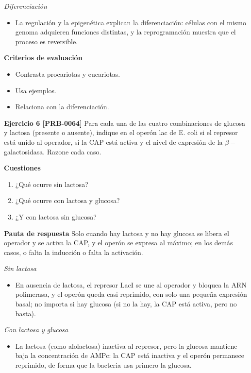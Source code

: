 \documentclass{book}
\begin{document}
\noindent\textit{Diferenciación}
\begin{itemize}
\item La regulación y la epigenética explican la diferenciación: células con el mismo genoma adquieren funciones distintas, y la reprogramación muestra que el proceso es reversible.
\end{itemize}

\noindent\textbf{Criterios de evaluación}
\begin{itemize}
\item Contrasta procariotas y eucariotas.
\item Usa ejemplos.
\item Relaciona con la diferenciación.
\end{itemize}

\noindent\textbf{Ejercicio 6 [PRB-0064]}
Para cada una de las cuatro combinaciones de glucosa y lactosa (presente o ausente), indique en el operón lac de E. coli si el represor está unido al operador, si la CAP está activa y el nivel de expresión de la \(\beta-\)galactosidasa. Razone cada caso.


\noindent\textbf{Cuestiones}
\begin{enumerate}
\item ¿Qué ocurre sin lactosa?
\item ¿Qué ocurre con lactosa y glucosa?
\item ¿Y con lactosa sin glucosa?
\end{enumerate}

\noindent\textbf{Pauta de respuesta}
Solo cuando hay lactosa y no hay glucosa se libera el operador y se activa la CAP, y el operón se expresa al máximo; en los demás casos, o falta la inducción o falta la activación.


\noindent\textit{Sin lactosa}
\begin{itemize}
\item En ausencia de lactosa, el represor LacI se une al operador y bloquea la ARN polimerasa, y el operón queda casi reprimido, con solo una pequeña expresión basal; no importa si hay glucosa (si no la hay, la CAP está activa, pero no basta).
\end{itemize}

\noindent\textit{Con lactosa y glucosa}
\begin{itemize}
\item La lactosa (como alolactosa) inactiva al represor, pero la glucosa mantiene baja la concentración de AMPc: la CAP está inactiva y el operón permanece reprimido, de forma que la bacteria usa primero la glucosa.
\end{itemize}
\end{document}
